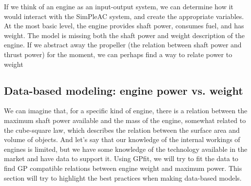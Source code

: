 If we think of an engine as an input-output system, we can determine how it
would interact with the SimPleAC system, and create the appropriate variables. 
At the most basic level, the engine provides shaft power, consumes fuel, 
and has weight. The model is missing both the shaft power and weight description
of the engine. If we abstract away the propeller (the relation between shaft
power and thrust power) for the moment, we can perhaps find a way to relate
power to weight

\subsection{Data-based modeling: engine power vs. weight}
\label{s:datafit}

We can imagine that, for a specific kind of engine, there is a relation between the 
maximum shaft power available and the mass of the engine, somewhat related to the 
cube-square law, which describes the relation between the surface area and volume 
of objects. And let's say that our knowledge of the internal workings of engines
is limited, but we have some knowledge of the technology available in the market
and have data to support it. Using GPfit, we will try to fit the data to find
\gls{GP} compatible relations between engine weight and maximum power. This section
will try to highlight the best practices when making data-based models. 

